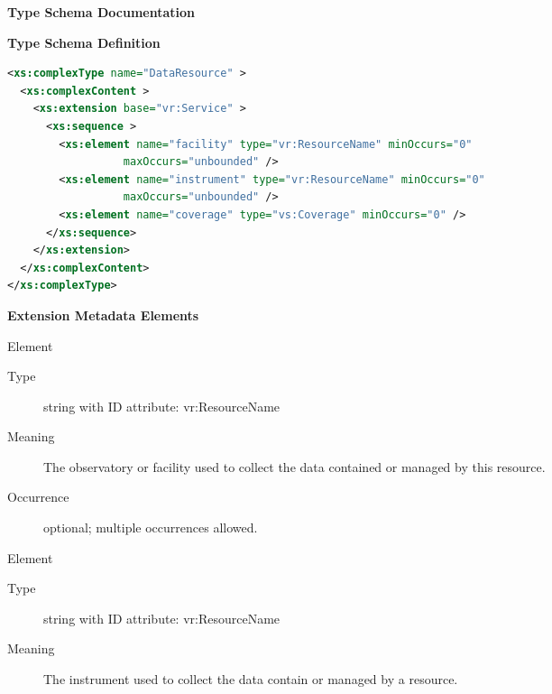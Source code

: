 \documentclass[11pt,a4paper]{ivoa}
\begin{document}
\begin{generated}
\begingroup
      	\renewcommand*\descriptionlabel[1]{%
      	\hbox to 5.5em{\emph{#1}\hfil}}\vspace{2ex}\noindent\textbf{ Type Schema Documentation}



\vspace{1ex}\noindent\textbf{ Type Schema Definition}

\begin{lstlisting}[language=XML,basicstyle=\footnotesize]
<xs:complexType name="DataResource" >
  <xs:complexContent >
    <xs:extension base="vr:Service" >
      <xs:sequence >
        <xs:element name="facility" type="vr:ResourceName" minOccurs="0"
                  maxOccurs="unbounded" />
        <xs:element name="instrument" type="vr:ResourceName" minOccurs="0"
                  maxOccurs="unbounded" />
        <xs:element name="coverage" type="vs:Coverage" minOccurs="0" />
      </xs:sequence>
    </xs:extension>
  </xs:complexContent>
</xs:complexType>
\end{lstlisting}

\vspace{0.5ex}\noindent\textbf{ Extension Metadata Elements}

\begingroup\small\begin{bigdescription}\item[Element \xmlel{facility}]
\begin{description}
\item[Type] string with ID attribute: vr:ResourceName
\item[Meaning] 
                     The observatory or facility used to collect the data 
                     contained or managed by this resource.  
                   
\item[Occurrence] optional; multiple occurrences allowed.

\end{description}
\item[Element \xmlel{instrument}]
\begin{description}
\item[Type] string with ID attribute: vr:ResourceName
\item[Meaning] 
                     The instrument used to collect the data contain or 
                     managed by a resource.  
                   

\end{description}
\end{bigdescription}
\end{generated}
\end{document}

